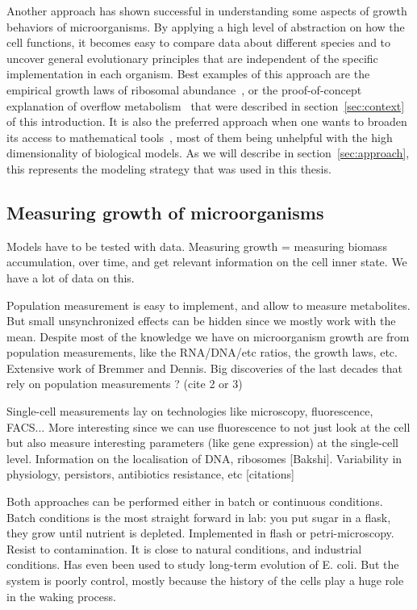 Another approach has shown successful in understanding some aspects of growth behaviors of microorganisms.
By applying a high level of abstraction on how the cell functions, it becomes easy to compare data about different species and to uncover general evolutionary principles that are independent of the specific implementation in each organism.
Best examples of this approach are the empirical growth laws of ribosomal abundance~\cite{scott_bacterial_2011,scott_interdependence_2010,scott_emergence_2014}, or the proof-of-concept explanation of overflow metabolism~\cite{molenaar_shifts_2009} that were described in section~\ref{sec:context} of this introduction.
It is also the preferred approach when one wants to broaden its access to mathematical tools~\cite{vandenberg_optimal_1998}, most of them being unhelpful with the high dimensionality of biological models.
As we will describe in section~\ref{sec:approach}, this represents the modeling strategy that was used in this thesis.

\subsection{Measuring growth of microorganisms}

Models have to be tested with data.
Measuring growth = measuring biomass accumulation, over time, and get relevant information on the cell inner state.
We have a lot of data on this.

Population measurement is easy to implement, and allow to measure metabolites.
But small unsynchronized effects can be hidden since we mostly work with the mean.
Despite most of the knowledge we have on microorganism growth are from population measurements, like the RNA/DNA/etc ratios, the growth laws, etc.
Extensive work of Bremmer and Dennis.
Big discoveries of the last decades that rely on population measurements ? (cite 2 or 3)

Single-cell measurements lay on technologies like microscopy, fluorescence, FACS...
More interesting since we can use fluorescence to not just look at the cell but also measure interesting parameters (like gene expression) at the single-cell level.
Information on the localisation of DNA, ribosomes [Bakshi].
Variability in physiology, persistors, antibiotics resistance, etc [citations]

Both approaches can be performed either in batch or continuous conditions.
Batch conditions is the most straight forward in lab: you put sugar in a flask, they grow until nutrient is depleted.
Implemented in flash or petri-microscopy.
Resist to contamination.
It is close to natural conditions, and industrial conditions.
Has even been used to study long-term evolution of E. coli.
But the system is poorly control, mostly because the history of the cells play a huge role in the waking process.

